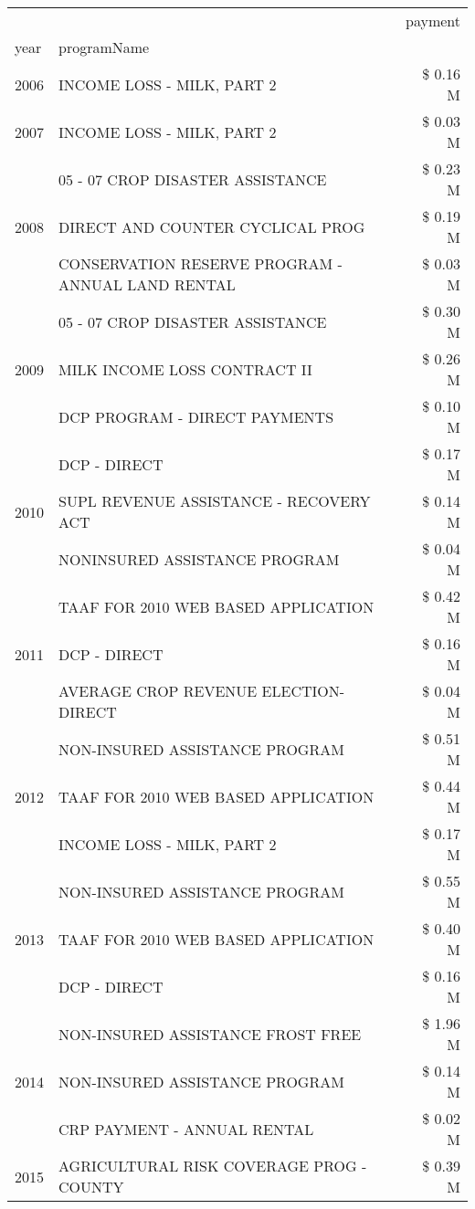 \begin{tabular}{llr}
\toprule
 &  & payment \\
year & programName &  \\
\midrule
2006 & INCOME LOSS - MILK, PART 2 & \$ 0.16 M \\
\cline{1-3}
2007 & INCOME LOSS - MILK, PART 2 & \$ 0.03 M \\
\cline{1-3}
\multirow[t]{3}{*}{2008} & 05 - 07 CROP DISASTER ASSISTANCE & \$ 0.23 M \\
 & DIRECT AND COUNTER CYCLICAL PROG & \$ 0.19 M \\
 & CONSERVATION RESERVE PROGRAM - ANNUAL LAND RENTAL & \$ 0.03 M \\
\cline{1-3}
\multirow[t]{3}{*}{2009} & 05 - 07 CROP DISASTER ASSISTANCE & \$ 0.30 M \\
 & MILK INCOME LOSS CONTRACT II & \$ 0.26 M \\
 & DCP PROGRAM - DIRECT PAYMENTS & \$ 0.10 M \\
\cline{1-3}
\multirow[t]{3}{*}{2010} & DCP - DIRECT & \$ 0.17 M \\
 & SUPL REVENUE ASSISTANCE - RECOVERY ACT & \$ 0.14 M \\
 & NONINSURED ASSISTANCE PROGRAM & \$ 0.04 M \\
\cline{1-3}
\multirow[t]{3}{*}{2011} & TAAF FOR 2010 WEB BASED APPLICATION & \$ 0.42 M \\
 & DCP - DIRECT & \$ 0.16 M \\
 & AVERAGE CROP REVENUE ELECTION-DIRECT & \$ 0.04 M \\
\cline{1-3}
\multirow[t]{3}{*}{2012} & NON-INSURED ASSISTANCE PROGRAM & \$ 0.51 M \\
 & TAAF FOR 2010 WEB BASED APPLICATION & \$ 0.44 M \\
 & INCOME LOSS - MILK, PART 2 & \$ 0.17 M \\
\cline{1-3}
\multirow[t]{3}{*}{2013} & NON-INSURED ASSISTANCE PROGRAM & \$ 0.55 M \\
 & TAAF FOR 2010 WEB BASED APPLICATION & \$ 0.40 M \\
 & DCP - DIRECT & \$ 0.16 M \\
\cline{1-3}
\multirow[t]{3}{*}{2014} & NON-INSURED ASSISTANCE FROST FREE & \$ 1.96 M \\
 & NON-INSURED ASSISTANCE PROGRAM & \$ 0.14 M \\
 & CRP PAYMENT - ANNUAL RENTAL & \$ 0.02 M \\
\cline{1-3}
\multirow[t]{3}{*}{2015} & AGRICULTURAL RISK COVERAGE PROG - COUNTY & \$ 0.39 M \\

\end{tabular}
